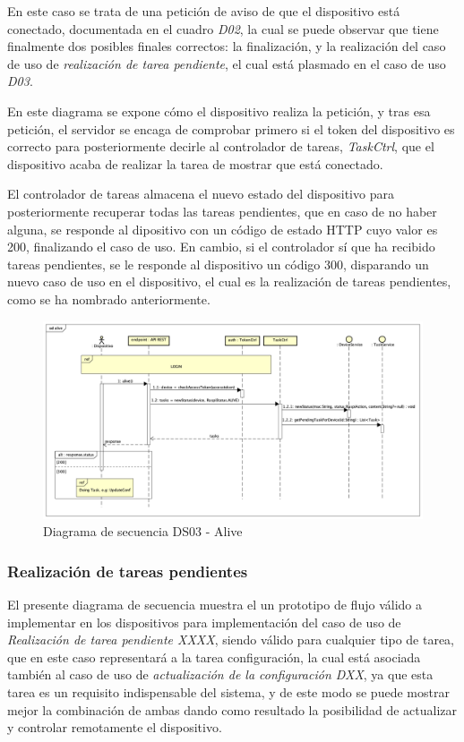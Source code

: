 En este caso se trata de una petición de aviso de que el dispositivo está conectado, documentada en el cuadro \textit{D02}, la cual se puede observar que tiene finalmente dos posibles finales correctos: la finalización, y la realización del caso de uso de \textit{realización de tarea pendiente}, el cual está plasmado en el caso de uso \textit{D03}.

En este diagrama se expone cómo el dispositivo realiza la petición, y tras esa petición, el servidor se encaga de comprobar primero si el token del dispositivo es correcto para posteriormente decirle al controlador de tareas, \textit{TaskCtrl}, que el dispositivo acaba de realizar la tarea de mostrar que está conectado.

El controlador de tareas almacena el nuevo estado del dispositivo para posteriormente recuperar todas las tareas pendientes, que en caso de no haber alguna, se responde al dipositivo con un código de estado HTTP cuyo valor es 200, finalizando el caso de uso.
En cambio, si el controlador sí que ha recibido tareas pendientes, se le responde al dispositivo un código 300, disparando un nuevo caso de uso en el dispositivo, el cual es la realización de tareas pendientes, como se ha nombrado anteriormente.

\begin{figure}[H]
    \centering
    \includegraphics[width=14cm]{./img/sequence/diagram/alive.png}
    \caption{Diagrama de secuencia DS03 - Alive}
    \label{fig:seq.alive}
\end{figure}

\subsubsection{Realización de tareas pendientes}

El presente diagrama de secuencia muestra el un prototipo de flujo válido a implementar en los dispositivos para implementación del caso de uso de \textit{Realización de tarea pendiente XXXX}, siendo válido para cualquier tipo de tarea, que en este caso representará a la tarea configuración, la cual está asociada también al caso de uso de \textit{actualización de la configuración DXX}, ya que esta tarea es un requisito indispensable del sistema, y de este modo se puede mostrar mejor la combinación de ambas dando como resultado la posibilidad de actualizar y controlar remotamente el dispositivo.

